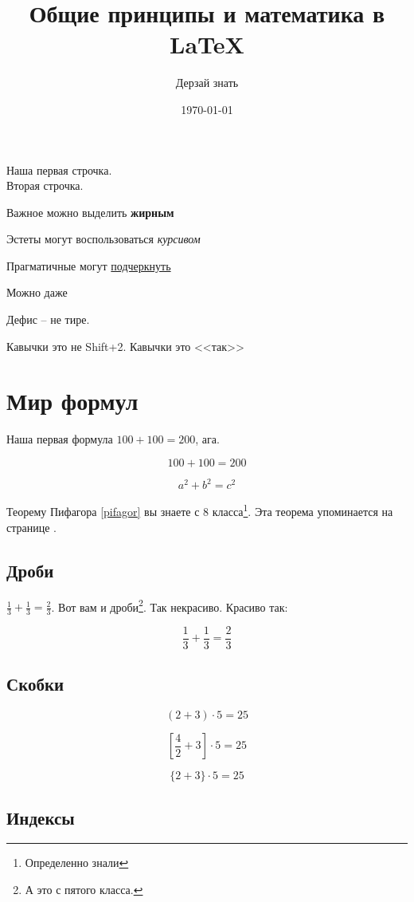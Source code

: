 \documentclass[a4paper,12pt]{article} %
\author{Дерзай знать}
\title{Общие принципы и математика в \LaTeX{}}
\date{\today}
\begin{document}

\maketitle
\newpage

Наша первая строчка.\\[2cm]
Вторая \hspace{20pt} строчка.

Важное можно выделить \textbf{жирным}

Эстеты могут воспользоваться \textit{курсивом}

Прагматичные могут \underline{подчеркнуть}

Можно даже 

Дефис -- не тире.

Кавычки это не Shift+2. Кавычки это <<так>>

\section{Мир формул}

Наша первая формула $100+100=200$, ага.

\[ 100+100=200 \]

\begin{equation}\label{eq: ifagor}
a^2+b^2=c^2
\end{equation}

Теорему Пифагора \eqref{pifagor} вы знаете с 8 класса\footnote{Определенно знали}. Эта теорема упоминается на странице \pageref{pifagor}.

\subsection{Дроби}

$\frac{1}{3}+\frac{1}{3}=\frac{2}{3}$. Вот вам и дроби\footnote{А это с пятого класса.}. {\scriptsize Так некрасиво.} {\Large Красиво так}:

\[ \frac{1}{3}+\frac{1}{3}=\frac{2}{3} \]


\subsection{Скобки}

\[ (2+3)\cdot 5=25 \]

\[ \left[\frac{4}{2}+3\right]\cdot 5=25 \]

\[ \{2+3\}\cdot 5=25 \]

\subsection{Индексы}
\end{document}

